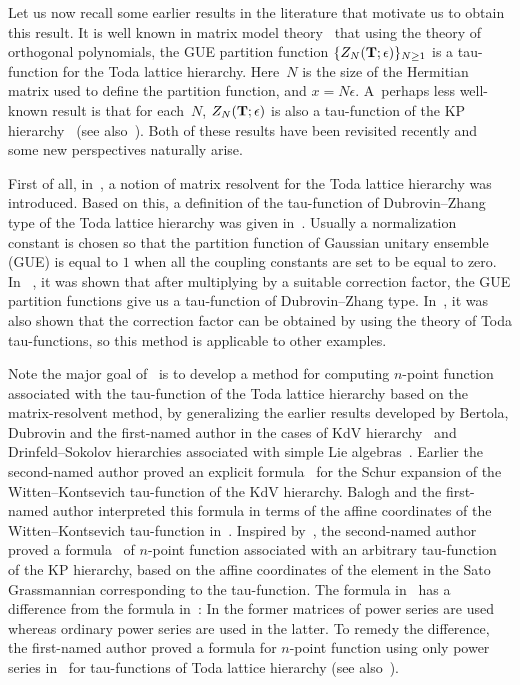 \documentclass[pdftex]{sigma}
\newcommand{\e}{\epsilon}
\numberwithin{equation}{section}
\begin{document}
Let us now recall some earlier results in the literature that motivate us to obtain this result.
It is well known in matrix model theory~\cite{AvM, GMMMO}
that using the theory of orthogonal polynomials,
the GUE partition function $\{Z_N({\bf T};\e)\}_{N \geq 1}$ is a tau-function for the Toda lattice hierarchy.
Here~$N$ is the size of the Hermitian matrix used to define the partition function, and $x=N\e$.
A~perhaps less well-known result is that for each~$N$, $Z_N({\bf T};\e)$ is also a tau-function of the KP hierarchy~\cite{Shaw-Tu-Yen} (see also~\cite{KMMM}).
Both of these results have been revisited recently and some new perspectives naturally arise.

First of all,
in~\cite[Deﬁnition 1.2.2]{DY},
a notion of matrix resolvent for the Toda lattice hierarchy was introduced.
Based on this,
a definition of the tau-function of Dubrovin--Zhang type of the Toda lattice hierarchy was given in~\cite[Definition 1.2.4]{DY}.
Usually a normalization constant is chosen so that the partition function of Gaussian unitary ensemble (GUE) is equal to $1$
when all the coupling constants are set to be equal to zero.
In ~\cite[Appendix A]{DY}, it was shown that after multiplying by a suitable correction factor,
the GUE partition functions give us a tau-function of Dubrovin--Zhang type.
 In~\cite{DY}, it was also shown that the correction factor can be obtained by using the theory of
Toda tau-functions, so this method is applicable to other examples.

Note the major goal of~\cite{DY} is to develop a method
for computing $n$-point function associated with the tau-function
of the Toda lattice hierarchy based on the matrix-resolvent method,
by generalizing the earlier results developed by Bertola, Dubrovin and the first-named
author in the cases of KdV hierarchy~\cite{BDY1} and Drinfeld--Sokolov hierarchies associated
with simple Lie algebras~\cite{BDY2}.
Earlier the second-named author proved an explicit formula~\cite{Zhou-WK} for the Schur expansion
of the Witten--Kontsevich tau-function of the KdV hierarchy.
Balogh and the first-named author interpreted this formula in terms of the
affine coordinates of the Witten--Kontsevich tau-function in~\cite{BY}.
Inspired by~\cite{BDY1},
the second-named author proved a formula~\cite{Zhou-Emergent}
 of $n$-point function associated with
an arbitrary tau-function of the KP hierarchy,
based on the affine coordinates of the element in the Sato Grassmannian
corresponding to the tau-function.
The formula in~\cite{DY} has a difference from the formula in~\cite{Zhou-Emergent}:
In the former matrices of power series are used whereas ordinary power series are used in the latter.
To remedy the difference, the first-named author proved a formula for $n$-point function
using only power series in~\cite{Y} for tau-functions of Toda lattice hierarchy (see also~\cite{DYZ}).
\end{document}
